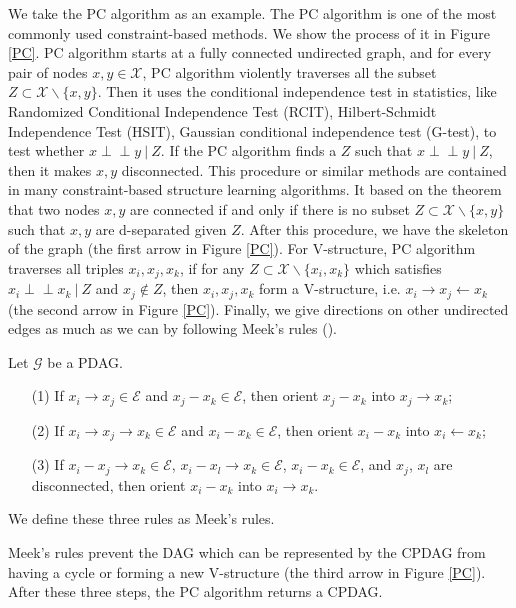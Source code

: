 \documentclass[twoside,11pt]{article}
\begin{document}
We take the PC algorithm as an example. The PC algorithm is one of the most commonly used constraint-based methods. We show the process of it in Figure \ref{PC}. PC algorithm starts at a fully connected undirected graph, and for every pair of nodes $x,y\in \mathcal X$, PC algorithm violently traverses all the subset $Z\subset \mathcal X \backslash\{x,y\}$. Then it uses the conditional independence test in statistics, like Randomized Conditional Independence Test (RCIT), Hilbert-Schmidt Independence Test (HSIT), Gaussian conditional independence test (G-test), to test whether $x\perp\!\!\!\perp y\ |\ Z$. If the PC algorithm finds a $Z$ such that $x\perp\!\!\!\perp y\ |\ Z$, then it makes $x,y$ disconnected. This procedure or similar methods are contained in many constraint-based structure learning algorithms. It based on the theorem that two nodes $x,y$ are connected if and only if there is no subset $Z\subset \mathcal X\backslash\{x,y\}$ such that $x,y$ are d-separated given $Z$. After this procedure, we have the skeleton of the graph (the first arrow in Figure \ref{PC}).  For V-structure, PC algorithm traverses all triples $x_i, x_j, x_k$, if for any $Z\subset \mathcal X\backslash \{x_i, x_k\}$ which satisfies $x_i \perp\!\!\!\perp x_k\ |\ Z$ and $x_j\notin Z$, then $x_i, x_j, x_k$ form a V-structure, i.e. $x_i\to x_j \gets x_k$ (the second arrow in Figure \ref{PC}). Finally, we give directions on other undirected edges as much as we can by following Meek's rules (\cite{meek2013causal}).
\begin{definition}
\label{Meek}
 Let $\mathcal G$ be a PDAG.
 \begin{itemize}
     \item [(1)] If $x_i \to x_j\in\mathcal E$ and $x_j - x_k \in \mathcal E$, then orient $x_j-x_k$ into $x_j\to x_k$;
     \item [(2)] If $x_i\to x_j\to x_k \in \mathcal E$ and $x_i - x_k\in\mathcal E$, then orient $x_i-x_k$ into $x_i\gets x_k$;
     \item [(3)] If $x_i-x_j\to x_k\in \mathcal E$, $x_i-x_l\to x_k\in\mathcal E$, $x_i-x_k\in\mathcal E$, and $x_j$, $x_l$ are disconnected, then orient $x_i-x_k$ into $x_i\to x_k$.
 \end{itemize}
 We define these three rules as Meek's rules.
\end{definition}
Meek's rules prevent the DAG which can be represented by the CPDAG from having a cycle or forming a new V-structure (the third arrow in Figure \ref{PC}). After these three steps, the PC algorithm returns a CPDAG.
\end{document}
